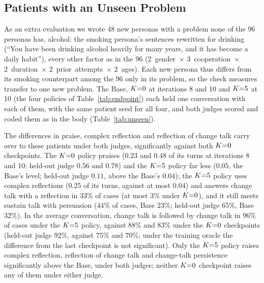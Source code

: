 \subsection{Patients with an Unseen Problem}
\label{app:unseen}

As an extra evaluation we wrote 48 new personas with a problem none of the 96 personas has, alcohol:
the smoking persona's sentences rewritten for drinking (``You have been drinking alcohol heavily
for many years, and it has become a daily habit''), every other factor as in the 96
(2~gender~$\times$ 3~cooperation~$\times$ 2~duration~$\times$ 2~prior~attempts~$\times$ 2~ages).
Each new persona thus differs from its smoking counterpart among the 96 only in its problem, so the
check measures transfer to one new problem. The Base, $K{=}0$ at iterations 8 and 10 and $K{=}5$ at 10
(the four policies of Table~\ref{tab:endpoint}) each held one conversation with each of them, with
the same patient seed for all four, and both judges scored and coded them as in the body
(Table~\ref{tab:unseen}).

The differences in praise, complex reflection and reflection of change talk carry over to these
patients under both judges, significantly against both $K{=}0$ checkpoints. The $K{=}0$ policy praises
($0.23$ and $0.48$ of its turns at iterations 8 and 10; held-out judge $0.56$ and $0.78$) and the
$K{=}5$ policy far less ($0.05$, the Base's level; held-out judge $0.11$, above the Base's $0.04$);
the $K{=}5$ policy uses complex reflections ($0.25$ of its turns, against at most $0.04$) and answers
change talk with a reflection in $33\%$ of cases (at most $3\%$ under $K{=}0$), and it still meets
sustain talk with persuasion ($44\%$ of cases, Base $23\%$; held-out judge $65\%$, Base $32\%$). In
the average conversation, change talk is followed by change talk in $96\%$ of cases under the $K{=}5$
policy, against $88\%$ and $83\%$ under the $K{=}0$ checkpoints (held-out judge $92\%$, against $75\%$
and $70\%$; under the training oracle the difference from the last checkpoint is not significant).
Only the $K{=}5$ policy raises complex reflection, reflection of change talk and change-talk
persistence significantly above the Base, under both judges; neither $K{=}0$ checkpoint raises any of
them under either judge.

